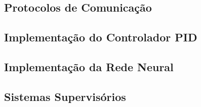 \subsection{Protocolos de Comunicação}

\subsection{Implementação do Controlador PID}

\subsection{Implementação da Rede Neural}

\subsection{Sistemas Supervisórios}
